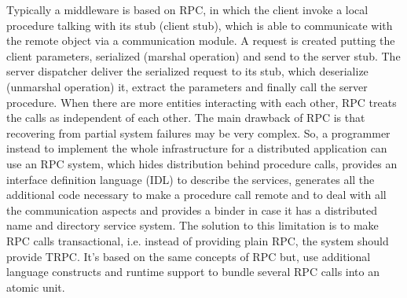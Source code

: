 \documentclass[11pt]{article}
\begin{document}
Typically a middleware is based on RPC, in which the client invoke a local procedure talking with its stub (client stub), which is able to communicate with the remote object via a communication module. A request is created putting the client parameters, serialized (marshal operation) and send to the server stub. The server dispatcher deliver the serialized request to its stub, which deserialize (unmarshal operation) it, extract the parameters and finally call the server procedure. When there are more entities interacting with each other, RPC treats the calls as independent of each other. The main drawback of RPC is that recovering from partial system failures may be very complex. So, a programmer instead to implement the whole infrastructure for a distributed application can use an RPC system, which hides distribution behind procedure calls, provides an interface definition language (IDL) to describe the services, generates all the additional code necessary to make a procedure call remote and to deal with all the communication aspects and provides a binder in case it has a distributed name and directory service system. The solution to this limitation is to make RPC calls transactional, i.e. instead of providing plain RPC, the system should provide TRPC. It's based on the same concepts of RPC but, use additional language constructs and runtime support to bundle several RPC calls into an atomic unit.
\end{document}
